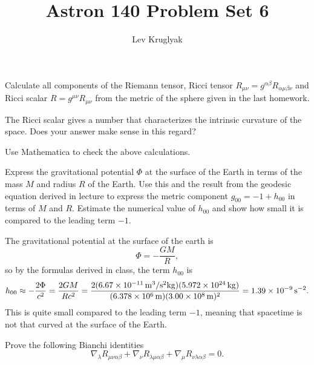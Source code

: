 \documentclass{../../templates/lkx_pset}
\title{Astron 140 Problem Set 6}
\author{Lev Kruglyak}
\begin{document}
\maketitle

\begin{problem}{1}
  Calculate all components of the Riemann tensor, Ricci tensor $R_{\mu\nu} = g^{\alpha\beta}R_{\alpha\mu\beta\nu}$ and Ricci scalar $R = g^{\mu\nu}R_{\mu\nu}$ from the metric of the sphere given in the last homework.
\end{problem}

\begin{parts}
  \begin{part}{}
    The Ricci scalar gives a number that characterizes the intrinsic curvature of the space. Does your answer make sense in this regard?
  \end{part}
\end{parts}

\begin{problem}{2}
  Use Mathematica to check the above calculations.
\end{problem}
\begin{solution}
\end{solution}

\begin{problem}{3}
  Express the gravitational potential $\Phi$ at the surface of the Earth in terms of the mass $M$ and radius $R$ of the Earth. Use this and the result from the geodesic equation derived in lecture to express the metric component $g_{00} = -1 + h_{00}$ in terms of $M$ and $R$. Estimate the numerical value of $h_{00}$ and show how small it is compared to the leading term $-1$.
\end{problem}

\begin{solution}
  The gravitational potential at the surface of the earth is
  \[
    \Phi = -\frac{GM}{R},
  \]
  so by the formulas derived in class, the term $h_{00}$ is 
  \[
    h_{00} \approx -\frac{2\Phi}{c^2} = \frac{2GM}{Rc^2} = \frac{2(\Gsi{6.67e-11})(\kgsi{5.972e24})}{(\msi{6.378e6})(\msi{3.00e8})^2}=\psssi{1.39e-9}.
  \]
  This is quite small compared to the leading term $-1$, meaning that spacetime is not that curved at the surface of the Earth.
\end{solution}

\begin{problem}{4}
  Prove the following Bianchi identities
  \[
    \nabla_\lambda R_{\mu\nu\alpha\beta} + \nabla_\nu R_{\lambda\mu\alpha\beta} + \nabla_\mu R_{\nu\lambda\alpha\beta} = 0.
  \]
\end{problem}
\end{document}
